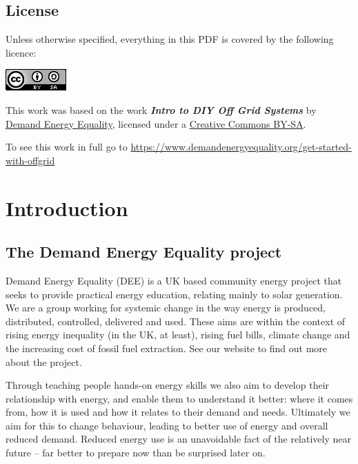 \documentclass{article}
\theoremstyle{definition}
\theoremstyle{definition}
\theoremstyle{remark}
\begin{document}
  \subsection*{License} %
  \label{sub:license}

    Unless otherwise specified, everything in this PDF is covered by the following licence:

    \includegraphics[]{../Images/image_0_2_(license).png} \newline

    This work was based on the work \textbf{\textit{Intro to DIY Off Grid Systems}} by \href{https://www.demandenergyequality.org/}{Demand Energy Equality}, licensed under a \href{https://creativecommons.org/licenses/by-sa/4.0/legalcode}{Creative Commons BY-SA}.

    To see this work in full go to \href{https://www.demandenergyequality.org/get-started-with-offgrid}{https://www.demandenergyequality.org/get-started-with-offgrid}
  


\newpage

\section{Introduction} %
\label{sec:introduction}

  \subsection{The Demand Energy Equality project} %
  \label{sub:the_demand_energy_equality_project}

    Demand Energy Equality (DEE) is a UK based community energy project that seeks to provide practical energy education, relating mainly to solar generation. We are a group working for systemic change in the way energy is produced, distributed, controlled, delivered and used. These aims are within the context of rising energy inequality (in the UK, at least), rising fuel bills, climate change and the increasing cost of fossil fuel extraction. See our website to find out more about the project.

    Through teaching people hands-on energy skills we also aim to develop their relationship with energy, and enable them to understand it better: where it comes from, how it is used and how it relates to their demand and needs. Ultimately we aim for this to change behaviour, leading to better use of energy and overall reduced demand. Reduced energy use is an unavoidable fact of the relatively near future – far better to prepare now than be surprised later on.
\end{document}
